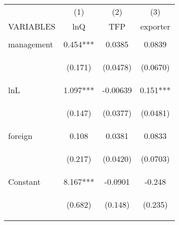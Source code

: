 \begin{center}
\begin{tabular}{lccc} \hline
 & (1) & (2) & (3) \\
VARIABLES & lnQ & TFP & exporter \\ \hline
\vspace{4pt} & \begin{footnotesize}\end{footnotesize} & \begin{footnotesize}\end{footnotesize} & \begin{footnotesize}\end{footnotesize} \\
management & 0.454*** & 0.0385 & 0.0839 \\
\vspace{4pt} & \begin{footnotesize}(0.171)\end{footnotesize} & \begin{footnotesize}(0.0478)\end{footnotesize} & \begin{footnotesize}(0.0670)\end{footnotesize} \\
lnL & 1.097*** & -0.00639 & 0.151*** \\
\vspace{4pt} & \begin{footnotesize}(0.147)\end{footnotesize} & \begin{footnotesize}(0.0377)\end{footnotesize} & \begin{footnotesize}(0.0481)\end{footnotesize} \\
foreign & 0.108 & 0.0381 & 0.0833 \\
\vspace{4pt} & \begin{footnotesize}(0.217)\end{footnotesize} & \begin{footnotesize}(0.0420)\end{footnotesize} & \begin{footnotesize}(0.0703)\end{footnotesize} \\
Constant & 8.167*** & -0.0901 & -0.248 \\
 & \begin{footnotesize}(0.682)\end{footnotesize} & \begin{footnotesize}(0.148)\end{footnotesize} & \begin{footnotesize}(0.235)\end{footnotesize} \\

\end{tabular}
\end{center}
